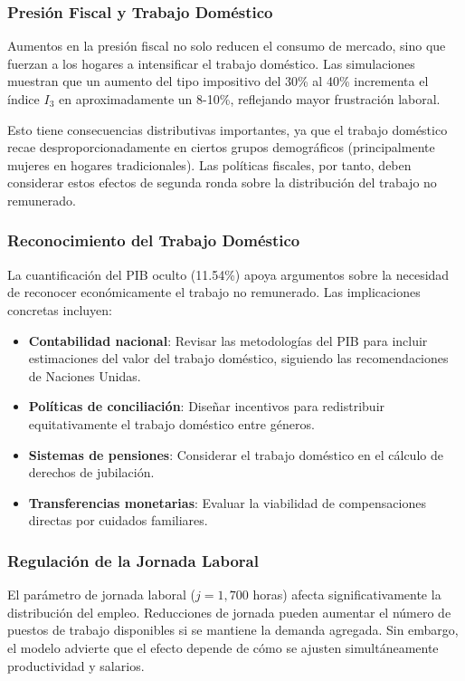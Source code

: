 \subsubsection{Presión Fiscal y Trabajo Doméstico}

Aumentos en la presión fiscal no solo reducen el consumo de mercado, sino que fuerzan a los hogares a intensificar el trabajo doméstico. Las simulaciones muestran que un aumento del tipo impositivo del 30\% al 40\% incrementa el índice $I_3$ en aproximadamente un 8-10\%, reflejando mayor frustración laboral.

Esto tiene consecuencias distributivas importantes, ya que el trabajo doméstico recae desproporcionadamente en ciertos grupos demográficos (principalmente mujeres en hogares tradicionales). Las políticas fiscales, por tanto, deben considerar estos efectos de segunda ronda sobre la distribución del trabajo no remunerado.

\subsubsection{Reconocimiento del Trabajo Doméstico}

La cuantificación del PIB oculto (11.54\%) apoya argumentos sobre la necesidad de reconocer económicamente el trabajo no remunerado. Las implicaciones concretas incluyen:

\begin{itemize}
    \item \textbf{Contabilidad nacional}: Revisar las metodologías del PIB para incluir estimaciones del valor del trabajo doméstico, siguiendo las recomendaciones de Naciones Unidas.
    \item \textbf{Políticas de conciliación}: Diseñar incentivos para redistribuir equitativamente el trabajo doméstico entre géneros.
    \item \textbf{Sistemas de pensiones}: Considerar el trabajo doméstico en el cálculo de derechos de jubilación.
    \item \textbf{Transferencias monetarias}: Evaluar la viabilidad de compensaciones directas por cuidados familiares.
\end{itemize}

\subsubsection{Regulación de la Jornada Laboral}

El parámetro de jornada laboral ($j = 1,700$ horas) afecta significativamente la distribución del empleo. Reducciones de jornada pueden aumentar el número de puestos de trabajo disponibles si se mantiene la demanda agregada. Sin embargo, el modelo advierte que el efecto depende de cómo se ajusten simultáneamente productividad y salarios.

